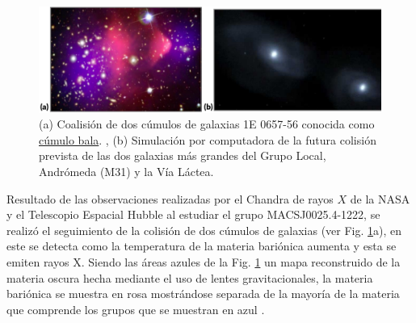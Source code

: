 \begin{figure}[htbp]
\centering
\includegraphics[width=.9\textwidth]{Fisica_de_Particulas/imagenes/fritz2.png}
\caption[(a) Coalisión de dos cúmulos de galaxias 1E 0657-56 conocida como \href{https://en.wikipedia.org/wiki/Bullet_Cluster}{cúmulo bala}.
, (b) Simulación por computadora de la futura colisión prevista de las dos galaxias más grandes del Grupo Local, Andrómeda (M31) y la Vía Láctea. ]{
(a) Coalisión de dos cúmulos de galaxias 1E 0657-56 conocida como \href{https://en.wikipedia.org/wiki/Bullet_Cluster}{cúmulo bala}.
, (b) Simulación por computadora de la futura colisión prevista de las dos galaxias más grandes del Grupo Local, Andrómeda (M31) y la Vía Láctea. \footnotemark }
\label{coalision}
\end{figure}
 

Resultado de las observaciones realizadas por el Chandra de rayos $X$ de la NASA y el Telescopio Espacial Hubble al estudiar el grupo MACSJ0025.4-1222, se realizó el seguimiento de la colisión de dos cúmulos de galaxias (ver Fig. \ref{coalision}a), en este se detecta como la temperatura de la materia bariónica aumenta y esta se emiten rayos X. Siendo las áreas azules de la Fig. \ref{coalision} un mapa reconstruido de la materia oscura hecha mediante el uso de lentes gravitacionales, la materia bariónica se muestra en rosa mostrándose separada de la mayoría de la materia que comprende los grupos que se muestran en azul \citep{marsh_strings_2019}.




